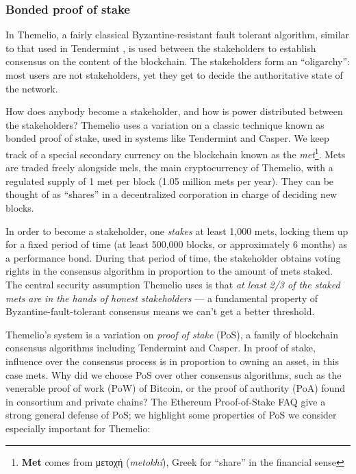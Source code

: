 \documentclass[headinclude]{scrbook}
\begin{document}
\subsubsection{Bonded proof of stake}

In Themelio, a fairly classical Byzantine-resistant fault tolerant algorithm, similar to that used in Tendermint \cite{kwon2014tendermint}, is used between the stakeholders to establish consensus on the content of the blockchain. The stakeholders form an ``oligarchy'': most users are not stakeholders, yet they get to decide the authoritative state of the network.

How does anybody become a stakeholder, and how is power distributed between the stakeholders? Themelio uses a variation on a classic technique known as bonded proof of stake, used in systems like Tendermint and Casper. We keep track of a special secondary currency on the blockchain known as the \textit{met}\footnote{\textbf{Met} comes from μετοχή (\textit{metokhí}), Greek for ``share'' in the financial sense}. Mets are traded freely alongside mels, the main cryptocurrency of Themelio, with a regulated supply of 1 met per block (1.05 million mets per year). They can be thought of as ``shares'' in a decentralized corporation in charge of deciding new blocks.

In order to become a stakeholder, one \emph{stakes} at least 1,000 mets, locking them up for a fixed period of time (at least 500,000 blocks, or approximately 6 months) as a performance bond. During that period of time, the stakeholder obtains voting rights in the consensus algorithm in proportion to the amount of mets staked. The central security assumption Themelio uses is that \textit{at least 2/3 of the staked mets are in the hands of honest stakeholders} --- a fundamental property of Byzantine-fault-tolerant consensus means we can't get a better threshold.

Themelio's system is a variation on \emph{proof of stake} (PoS), a family of blockchain consensus algorithms including Tendermint and Casper. In proof of stake, influence over the consensus process is in proportion to owning an asset, in this case mets. Why did we choose PoS over other consensus algorithms, such as the venerable proof of work (PoW) of Bitcoin, or the proof of authority (PoA) found in consortium and private chains? The Ethereum Proof-of-Stake FAQ \cite{buterin2019pos} give a strong general defense of PoS; we highlight some properties of PoS we consider especially important for Themelio:
\end{document}

